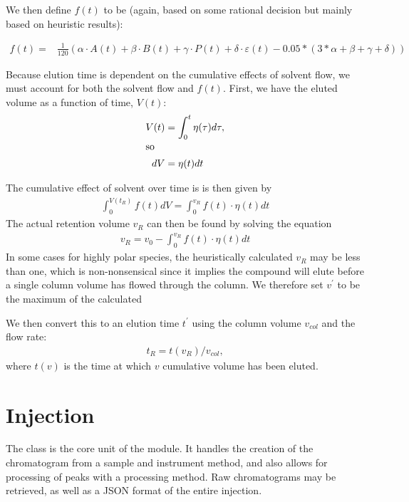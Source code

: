 \documentclass{article}
\newcommand{\cbtt}[1]{\textcolor{codepurple}{\fontseries{b}\selectfont{\texttt{#1}}}}
\begin{document}
We then define $f(t)$ to be (again, based on some rational decision but mainly based on heuristic results):

\begin{align}
f(t) = &\frac{1}{120} \left( \alpha \cdot A(t) +\beta \cdot B(t) + \gamma \cdot P(t) + \delta \cdot \varepsilon(t) - 0.05 * (3 * \alpha +\beta + \gamma + \delta) \right)
\end{align}

Because elution time is dependent on the cumulative effects of solvent flow, we must account for both the solvent flow and $f(t)$. First, we have the eluted volume as a function of time, $V(t)$:
\begin{align}
V(t) &= \int_0^t \eta(\tau) d\tau,\\
\intertext{so} 
dV &= \eta(t) dt
\end{align}

The cumulative effect of solvent over time is is then given by
\begin{align}
\int_0^{V(t_R)} f(t) dV = \int_0^{v_R} f(t) \cdot \eta(t) dt
\end{align} 
The actual retention volume $v_R$ can then be found by solving the equation 
\begin{align}
v_R = v_0 - \int_0^{v_R} f(t) \cdot \eta(t) dt
\end{align}
In some cases for highly polar species, the heuristically calculated $v_R$ may be less than one, which is non-nonsensical since it implies the compound will elute before a single column volume has flowed through the column. We therefore set $v^\prime$ to be the maximum of the calculated 

We then convert this to an elution time $t^\prime$ using the column volume $v_{col}$ and the flow rate:
\begin{align}
t_R = t(v_R) / v_{col},
\end{align}
where $t(v)$ is the time at which $v$ cumulative volume has been eluted. 

\section{Injection}
The \cbtt{Injection} class is the core unit of the module. It handles the creation of the chromatogram from a sample and instrument method, and also allows for processing of peaks with a processing method. Raw chromatograms may be retrieved, as well as a JSON format of the entire injection. 
\end{document}
